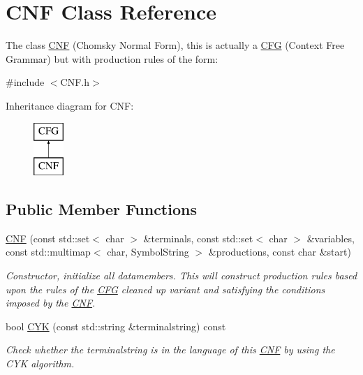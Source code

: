\hypertarget{class_c_n_f}{\section{C\-N\-F Class Reference}
\label{class_c_n_f}
}


The class \hyperlink{class_c_n_f}{C\-N\-F} (Chomsky Normal Form), this is actually a \hyperlink{class_c_f_g}{C\-F\-G} (Context Free Grammar) but with production rules of the form\-:  




{\ttfamily \#include $<$C\-N\-F.\-h$>$}

Inheritance diagram for C\-N\-F\-:\begin{figure}[H]
\begin{center}
\leavevmode
\includegraphics[height=2.000000cm]{class_c_n_f}
\end{center}
\end{figure}
\subsection*{Public Member Functions}
\begin{DoxyCompactItemize}
\item 
\hyperlink{class_c_n_f_a284b4ec60a90f49dabba546ea637a345}{C\-N\-F} (const std\-::set$<$ char $>$ \&terminals, const std\-::set$<$ char $>$ \&variables, const std\-::multimap$<$ char, Symbol\-String $>$ \&productions, const char \&start)
\begin{DoxyCompactList}\small\item\em Constructor, initialize all datamembers. This will construct production rules based upon the rules of the \hyperlink{class_c_f_g}{C\-F\-G} cleaned up variant and satisfying the conditions imposed by the \hyperlink{class_c_n_f}{C\-N\-F}. \end{DoxyCompactList}\item 
bool \hyperlink{class_c_n_f_ae6dd043b79759b038cd627267bf7295c}{C\-Y\-K} (const std\-::string \&terminalstring) const 
\begin{DoxyCompactList}\small\item\em Check whether the terminalstring is in the language of this \hyperlink{class_c_n_f}{C\-N\-F} by using the C\-Y\-K algorithm. \end{DoxyCompactList}\end{DoxyCompactItemize}
